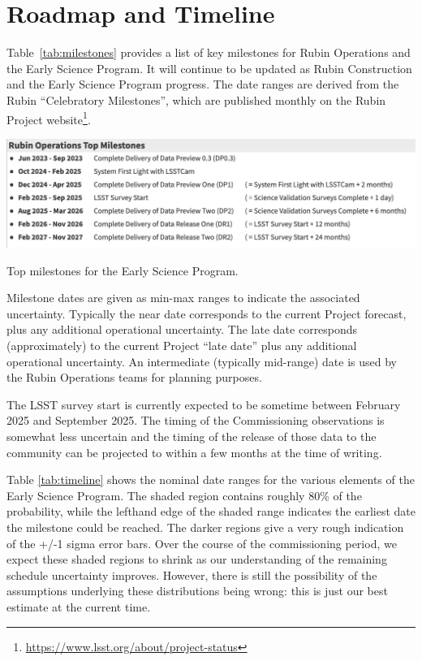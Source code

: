 \section{Roadmap and Timeline} \label{sec:timeline}

Table~\ref{tab:milestones} provides a list of key milestones for Rubin Operations and the Early Science Program.
It will continue to be updated as Rubin Construction and the Early Science Program progress. 
The date ranges are derived from the Rubin ``Celebratory Milestones'', which are  published monthly on the Rubin Project website\footnote{\url{https://www.lsst.org/about/project-status}}. 

\begin{table}[ht]
\centering
\includegraphics[width=\linewidth]{figures/DPR-milestones}
\caption{Top milestones for the Early Science Program.}
\label{tab:milestones}
\end{table}

Milestone dates are given as min-max ranges to indicate the associated uncertainty. 
Typically the near date corresponds to the current Project forecast, plus any additional operational uncertainty.
The late date corresponds (approximately) to the current Project ``late date'' plus any additional operational uncertainty.
An intermediate (typically mid-range) date is used by the Rubin Operations teams for planning purposes. 

The LSST survey start is currently expected to be sometime between February 2025 and September 2025.
The timing of the Commissioning observations is somewhat less uncertain and the timing of the release of those data to the community can be projected to within a few months at the time of writing.

Table \ref{tab:timeline} shows the nominal date ranges for the various elements of the Early Science Program. 
The shaded region contains roughly 80\% of the probability, while the lefthand edge of the shaded range indicates the earliest date the milestone could be reached. 
The darker regions give a very rough indication of the +/-1 sigma error bars. 
Over the course of the commissioning period, we expect these shaded regions to shrink as our understanding of the remaining schedule uncertainty improves. 
However, there is still the possibility of the assumptions underlying these distributions being wrong: this is just our best estimate at the current time.

